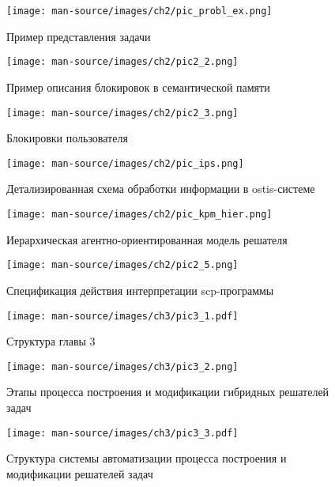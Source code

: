 \documentclass{thesisby}
\begin{document}
\begin{figure}[H]
  \centering
  \texttt{[image: man-source/images/ch2/pic\_probl\_ex.png]}
  \caption{Пример представления задачи}
  \label{fig:pic_probl_ex}
\end{figure}


\begin{figure}[H]
    \centering
    \texttt{[image: man-source/images/ch2/pic2\_2.png]}
    \caption{Пример описания блокировок в семантической памяти}
    \label{fig:pic2_2}
\end{figure}


\begin{figure}[H]
    \centering
    \texttt{[image: man-source/images/ch2/pic2\_3.png]}
    \caption{Блокировки пользователя}
    \label{fig:pic2_3}
\end{figure}


\begin{figure}[H]
    \centering
    \texttt{[image: man-source/images/ch2/pic\_ips.png]}
    \caption{Детализированная схема обработки информации в ostis-системе}
    \label{fig:pic_ips}
\end{figure}


\begin{figure}[H]
    \centering
    \texttt{[image: man-source/images/ch2/pic\_kpm\_hier.png]}
    \caption{Иерархическая агентно-ориентированная модель решателя}
    \label{fig:pic2_4}
\end{figure}


\begin{figure}[H]
    \centering
    \texttt{[image: man-source/images/ch2/pic2\_5.png]}
    \caption{Спецификация действия интерпретации scp-программы}
    \label{fig:pic2_5}
\end{figure}


\begin{figure}[H]
    \centering
    \texttt{[image: man-source/images/ch3/pic3\_1.pdf]}
    \caption{Структура главы 3}
    \label{fig:pic3_1}
\end{figure}


\begin{figure}[H]
    \centering
    \texttt{[image: man-source/images/ch3/pic3\_2.png]}
    \caption{Этапы процесса построения и модификации гибридных решателей задач}
    \label{fig:pic3_2}
\end{figure}


\begin{figure}[H]
    \centering
    \texttt{[image: man-source/images/ch3/pic3\_3.pdf]}
    \caption{Структура системы автоматизации процесса построения и модификации решателей задач}
    \label{fig:pic3_3}
\end{figure}
\end{document}
